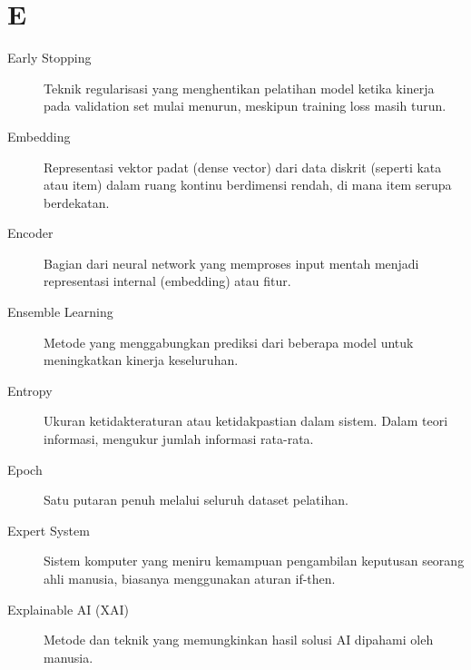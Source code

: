 \section*{E}
\begin{description}
    \item[Early Stopping] Teknik regularisasi yang menghentikan pelatihan model ketika kinerja pada validation set mulai menurun, meskipun training loss masih turun.
    \item[Embedding] Representasi vektor padat (dense vector) dari data diskrit (seperti kata atau item) dalam ruang kontinu berdimensi rendah, di mana item serupa berdekatan.
    \item[Encoder] Bagian dari neural network yang memproses input mentah menjadi representasi internal (embedding) atau fitur.
    \item[Ensemble Learning] Metode yang menggabungkan prediksi dari beberapa model untuk meningkatkan kinerja keseluruhan.
    \item[Entropy] Ukuran ketidakteraturan atau ketidakpastian dalam sistem. Dalam teori informasi, mengukur jumlah informasi rata-rata.
    \item[Epoch] Satu putaran penuh melalui seluruh dataset pelatihan.
    \item[Expert System] Sistem komputer yang meniru kemampuan pengambilan keputusan seorang ahli manusia, biasanya menggunakan aturan if-then.
    \item[Explainable AI (XAI)] Metode dan teknik yang memungkinkan hasil solusi AI dipahami oleh manusia.
\end{description}

